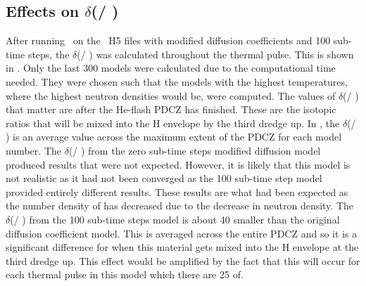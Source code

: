\documentclass[fleqn,usenatbib]{mnras}
\begin{document}
\subsection{Effects on $\delta$(\zirconium[96] / \zirconium[94])}
\label{sec:zr_zr}

After running \mppnp~on the \MESA~H5 files with modified diffusion coefficients and 100 sub-time steps, the $\delta$(\zirconium[96] / \zirconium[94]) was calculated throughout the thermal pulse. This is shown in . Only the last 300 models were calculated due to the computational time needed. They were chosen such that the models with the highest temperatures, where the highest neutron densities would be, were computed. The values of $\delta$(\zirconium[96] / \zirconium[94]) that matter are after the He-flash PDCZ has finished. These are the isotopic ratios that will be mixed into the H envelope by the third dredge up. In , the $\delta$(\zirconium[96] / \zirconium[94]) is an average value across the maximum extent of the PDCZ for each model number. The $\delta$(\zirconium[96] / \zirconium[94]) from the zero sub-time steps modified diffusion model produced results that were not expected. However, it is likely that this model is not realistic as it had not been converged as the 100 sub-time step model provided entirely different results. These results are what had been expected as the number density of \zirconium[96] has decreased due to the decrease in neutron density. The $\delta$(\zirconium[96] / \zirconium[94]) from the 100 sub-time steps model is about 40 smaller than the original diffusion coefficient model. This is averaged across the entire PDCZ and so it is a significant difference for when this material gets mixed into the H envelope at the third dredge up. This effect would be amplified by the fact that this will occur for each thermal pulse in this model which there are 25 of.
\end{document}
